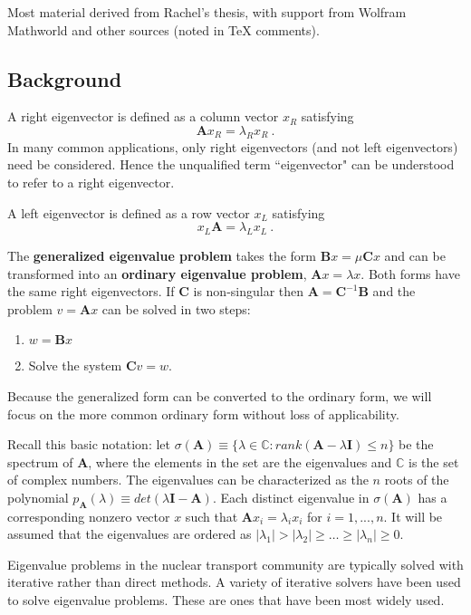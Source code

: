 \documentclass[12pt]{article}
\newcommand{\ve}[1]{\ensuremath{\mathbf{#1}}}
\begin{document}
Most material derived from Rachel's thesis, with support from Wolfram Mathworld and other sources (noted in TeX comments).

\subsection*{Background}
A right eigenvector is defined as a column vector $x_R$ satisfying
\[\ve{A}x_R=\lambda_R x_R\:.\] 
In many common applications, only right eigenvectors (and not left eigenvectors) need be considered. Hence the unqualified term ``eigenvector" can be understood to refer to a right eigenvector. %

A left eigenvector is defined as a row vector $x_L$ satisfying
\[ x_L\ve{A}=\lambda_L x_L\:.\] %

The \textbf{generalized eigenvalue problem} takes the form $\ve{B}x = \mu \ve{C}x$ and can be transformed into an \textbf{ordinary eigenvalue problem}, $\ve{A}x = \lambda x$. Both forms have the same right eigenvectors. If $\ve{C}$ is non-singular then $\ve{A} = \ve{C}^{-1}\ve{B}$ and the problem $v = \ve{A}x$ can be solved in two steps: %
%
\begin{enumerate}
  \item $w = \ve{B}x$
  \item Solve the system $\ve{C}v = w$.
\end{enumerate}
%
Because the generalized form can be converted to the ordinary form, we will focus on the more common ordinary form without loss of applicability.

Recall this basic notation: let $\sigma(\ve{A}) \equiv \{\lambda \in \mathbb{C} : rank(\ve{A} - \lambda \ve{I}) \le n\}$ be the spectrum of $\ve{A}$, where the elements in the set are the eigenvalues and $\mathbb{C}$ is the set of complex numbers. The eigenvalues can be characterized as the $n$ roots of the polynomial $p_{\ve{A}}(\lambda) \equiv det(\lambda \ve{I} - \ve{A})$. Each distinct eigenvalue in $\sigma(\ve{A})$ has a corresponding nonzero vector $x$ such that $\ve{A}x_{i} = \lambda_{i} x_{i}$ for $i = 1,...,n$. %
It will be assumed that the eigenvalues are ordered as $|\lambda_{1}| > |\lambda_{2}| \ge \dots \ge |\lambda_{n}| \ge 0$. 

Eigenvalue problems in the nuclear transport community are typically solved with iterative rather than direct methods. A variety of iterative solvers have been used to solve eigenvalue problems. These are ones that have been most widely used. 
\end{document}
